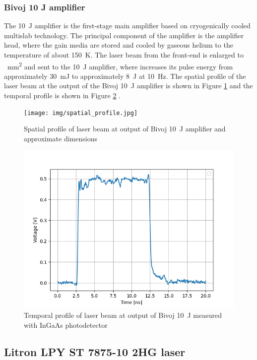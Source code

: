 \subsubsection*{Bivoj 10 J amplifier}

The \SI{10}{\joule}  amplifier is the first-stage main amplifier based on
cryogenically cooled multislab technology. The principal
component of the amplifier is the amplifier head, where the
gain media are stored and cooled by gaseous helium to 
the temperature of about \SI{150}{\kelvin}. The laser beam from the front-end
is enlarged to  \SI{}{\mm\squared} and sent to the \SI{10}{\joule} amplifier, where
increases its pulse energy from approximately \SI{30}{\milli\joule} to
approximately \SI{8}{\joule} at \SI{10}{\hertz}. The spatial profile of the laser beam at the output of the Bivoj \SI{10}{\joule} amplifier is shown in Figure \ref{fig:spatialprofile} and the temporal profile is shown in Figure \ref{fig:temporalprofile} \cite{saumyabrata}.

\begin{figure}[h]
    \centering
    \texttt{[image: img/spatial\_profile.jpg]}
    \caption{Spatial profile of laser beam at output of Bivoj \SI{10}{\joule} amplifier and approximate dimensions \protect\cite{kaufman}}
    \label{fig:spatialprofile}
\end{figure}

\begin{figure}[h]
    \centering
    \includegraphics[width=0.6\linewidth]{img/temporal_profile_bivoj_v_2.png}
    \caption{Temporal profile of laser beam at output of Bivoj \SI{10}{\joule} measured with InGaAs photodetector \protect\cite{kaufman}}
    \label{fig:temporalprofile}
\end{figure}

\subsection{Litron LPY ST 7875-10 2HG laser}


